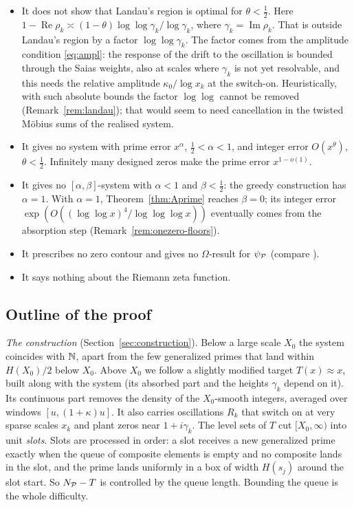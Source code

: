 \begin{remark}\label{rem:notshown}
\leavevmode
\begin{itemize}
\item It does not show that Landau's region is optimal for $\theta<\tfrac12$. Here
$1-\operatorname{Re}\rho_k\asymp(1-\theta)\log\log\gamma_k/\log\gamma_k$, where $\gamma_k=\operatorname{Im}\rho_k$. That is outside
Landau's region by a factor $\log\log\gamma_k$. The factor comes from the amplitude condition \eqref{eq:ampl}: the response of
the drift to the oscillation is bounded through the Saias weights, also at scales where $\gamma_k$ is not yet resolvable, and
this needs the relative amplitude $\kappa_0/\log x_k$ at the switch-on. Heuristically, with such absolute bounds the factor
$\log\log$ cannot be removed (Remark~\ref{rem:landau}); that would seem to need cancellation in the twisted M\"obius sums of the
realised system.
\item It gives no system with prime error $x^{\alpha}$, $\tfrac12<\alpha<1$, and integer error $O(x^{\theta})$, $\theta<\tfrac12$.
Infinitely many designed zeros make the prime error $x^{1-o(1)}$.
\item It gives no $[\alpha,\beta]$-system with $\alpha<1$ and $\beta<\tfrac12$: the greedy construction has $\alpha=1$. With
$\alpha=1$, Theorem~\ref{thm:Aprime} reaches $\beta=0$; its integer error $\exp(O((\log\log x)^4/\log\log\log x))$ eventually comes from the
absorption step (Remark~\ref{rem:onezero-floors}).
\item It prescribes no zero contour and gives no $\Omega$-result for $\psi_{\mathcal{P}}$ (compare \cite[Thm.~1.6]{Broucke2025}).
\item It says nothing about the Riemann zeta function.
\end{itemize}
\end{remark}

\subsection{Outline of the proof}
\emph{The construction} (Section~\ref{sec:construction}). Below a large scale $X_0$ the system coincides with $\mathbb{N}$, apart from
the few generalized primes that land within $H(X_0)/2$ below $X_0$. Above $X_0$ we follow a
slightly modified target $T(x)\approx x$, built along with the system (its absorbed part and the heights $\gamma_k$ depend on it). Its continuous part removes the density of the $X_0$-smooth integers,
averaged over windows $[u,(1+\kappa)u]$. It also carries oscillations $R_k$ that switch on at very sparse scales $x_k$ and plant
zeros near $1+i\gamma_k$. The level sets of $T$ cut $[X_0,\infty)$ into unit \emph{slots}. Slots are processed in order: a slot
receives a new generalized prime exactly when the queue of composite elements is empty and no composite lands in the slot, and
the prime lands uniformly in a
box of width $H(s_j)$ around the slot start. So $N_{\mathcal{P}}-T$ is controlled by the queue length. Bounding the queue is the whole
difficulty.


